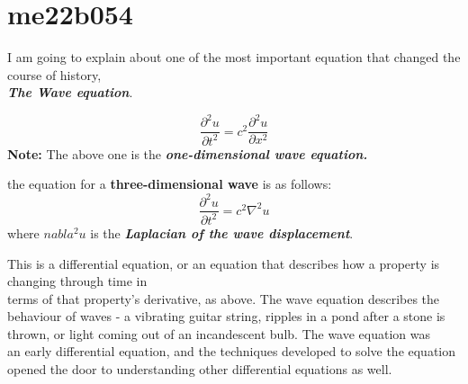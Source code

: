 \documentclass{article}
\begin{document}
\section{me22b054}
I am going to explain about one of the most important equation that changed the course of history, \\ \textbf{\textit{The Wave equation}}.

\begin{equation}
\frac{\partial^2 u}{\partial t^2} = c^2 \frac{\partial^2 u}{\partial x^2}
\end{equation}
 \textbf{Note:} The above one is the \textbf{\textit{one-dimensional wave equation.}}
 
 the equation for a \textbf{three-dimensional wave } is as follows:
 \begin{equation}
 \frac{\partial^2 u}{\partial t^2} = c^2 \nabla^2 u
 \end{equation}
  where \textbf{$nabla^2 u$} is the \textbf{\textit{Laplacian of the wave displacement}}.
  
  
 This is a differential equation, or an equation that describes how a property is changing through time in \\ terms of that property's  derivative, as above. The wave equation describes the \\ behaviour  of waves - a vibrating guitar string, ripples in a pond after a stone is \\ thrown,  or light coming out of an incandescent bulb. The wave equation was \\ an  early differential equation, and the techniques developed to solve the equation \\ opened the door to understanding other differential equations as well.
 
\end{document}
